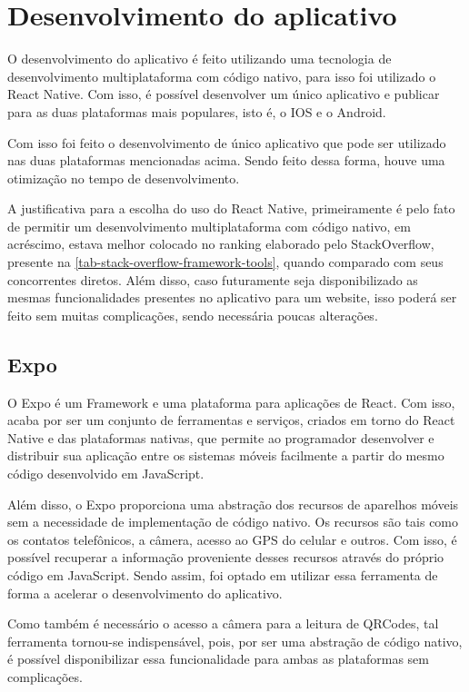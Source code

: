 \section{Desenvolvimento do aplicativo}\label{desenvApp}

O desenvolvimento do aplicativo é feito utilizando uma tecnologia de desenvolvimento multiplataforma com código nativo, para isso foi utilizado o React Native. Com isso, é possível desenvolver um único aplicativo e publicar para as duas plataformas mais populares, isto é, o IOS e o Android.

Com isso foi feito o desenvolvimento de único aplicativo que pode ser utilizado nas duas plataformas mencionadas acima. Sendo feito dessa forma, houve uma otimização no tempo de desenvolvimento.

A justificativa para a escolha do uso do React Native, primeiramente é pelo fato de permitir um desenvolvimento multiplataforma com código nativo, em acréscimo, estava melhor colocado no ranking elaborado pelo StackOverflow, presente na \autoref{tab-stack-overflow-framework-tools}, quando comparado com seus concorrentes diretos. Além disso, caso futuramente seja disponibilizado as mesmas funcionalidades presentes no aplicativo para um website, isso poderá ser feito sem muitas complicações, sendo necessária poucas alterações.

\subsection{Expo}

O Expo é um Framework e uma plataforma para aplicações de React. Com isso, acaba por ser um conjunto de ferramentas e serviços, criados em torno do React Native e das plataformas nativas, que permite ao programador desenvolver e distribuir sua aplicação entre os sistemas móveis facilmente a partir do mesmo código desenvolvido em JavaScript.

Além disso, o Expo proporciona uma abstração dos recursos de aparelhos móveis sem a necessidade de implementação de código nativo. Os recursos são tais como os contatos telefônicos, a câmera, acesso ao GPS do celular e outros. Com isso, é possível recuperar a informação proveniente desses recursos através do próprio código em JavaScript. Sendo assim, foi optado em utilizar essa ferramenta de forma a acelerar o desenvolvimento do aplicativo.

Como também é necessário o acesso a câmera para a leitura de QRCodes, tal ferramenta tornou-se indispensável, pois, por ser uma abstração de código nativo, é possível disponibilizar essa funcionalidade para ambas as plataformas sem complicações.

